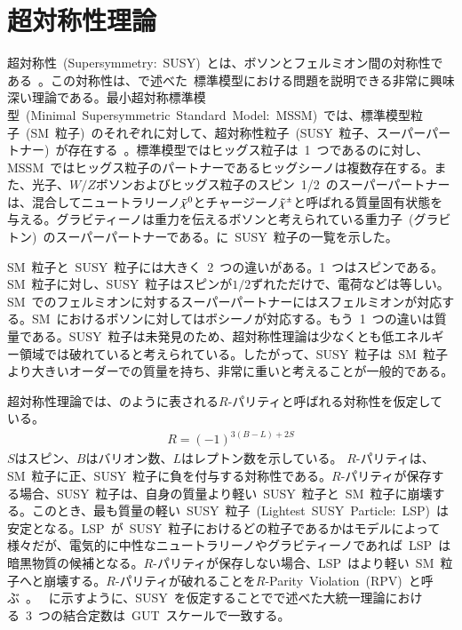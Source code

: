 \section{超対称性理論}
超対称性~(Supersymmetry:~SUSY)~とは、ボソンとフェルミオン間の対称性である~\cite{AR:12,AR:12a}。この対称性は、で述べた~標準模型における問題を説明できる非常に興味深い理論である。最小超対称標準模型~(Minimal~Supersymmetric~Standard~Model:~MSSM)~では、標準模型粒子~(SM~粒子)~のそれぞれに対して、超対称性粒子~(SUSY~粒子、スーパーパートナー)~が存在する~\cite{AR:12b}。標準模型ではヒッグス粒子は~1~つであるのに対し、MSSM~ではヒッグス粒子のパートナーであるヒッグシーノは複数存在する。また、光子、$W/Z$ボソンおよびヒッグス粒子のスピン~1/2~のスーパーパートナーは、混合してニュートラリーノ$\Tilde{\chi}^0$とチャージーノ$\Tilde{\chi}^{\pm}$と呼ばれる質量固有状態を与える。グラビティーノは重力を伝えるボソンと考えられている重力子~(グラビトン)~のスーパーパートナーである。に~SUSY~粒子の一覧を示した。

SM~粒子と~SUSY~粒子には大きく~2~つの違いがある。1~つはスピンである。SM~粒子に対し、SUSY~粒子はスピンが$1/2$ずれただけで、電荷などは等しい。SM~でのフェルミオンに対するスーパーパートナーにはスフェルミオンが対応する。SM~におけるボソンに対してはボシーノが対応する。もう~1~つの違いは質量である。SUSY~粒子は未発見のため、超対称性理論は少なくとも低エネルギー領域では破れていると考えられている。したがって、SUSY~粒子は~SM~粒子より大きいオーダーでの質量を持ち、非常に重いと考えることが一般的である。

超対称性理論では、のように表される$R$-パリティと呼ばれる対称性を仮定している。
\begin{align}
    R = (-1)^{3(B-L)+2S} \label{eq:Rparity}
\end{align}
$S$はスピン、$B$はバリオン数、$L$はレプトン数を示している。
$R$-パリティは、SM~粒子に正、SUSY~粒子に負を付与する対称性である。$R$-パリティが保存する場合、SUSY~粒子は、自身の質量より軽い~SUSY~粒子と~SM~粒子に崩壊する。このとき、最も質量の軽い~SUSY~粒子~(Lightest~SUSY~Particle:~LSP)~は安定となる。LSP~が~SUSY~粒子におけるどの粒子であるかはモデルによって様々だが、電気的に中性なニュートラリーノやグラビティーノであれば~LSP~は暗黒物質の候補となる。$R$-パリティが保存しない場合、LSP~はより軽い~SM~粒子へと崩壊する。$R$-パリティが破れることを$R$-Parity~Violation~(RPV)~と呼ぶ~\cite{AR:12g}。
~に示すように、SUSY~を仮定することでで述べた大統一理論における~3~つの結合定数は~GUT~スケールで一致する。

